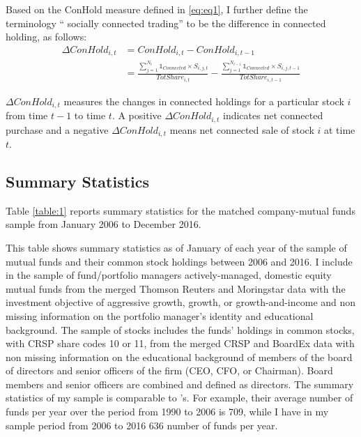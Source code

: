 \documentclass[11pt]{article}
\begin{document}
\begin{doublespace}
Based on the ConHold measure defined in \ref{eq:eq1}, I further define the terminology `` socially connected trading'' to be the difference in connected holding, as follows:
\begin{equation} \label{eq:eq2}
\begin{split}
 \Delta ConHold_{i,t} & = ConHold_{i,t} - ConHold_{i,t-1} \\
 & = \frac{\sum_{j=1}^{N_t}\mathbb{1}_{Connected} \times S_{i,j,t}} {TotShare_{i,t}}
 - \frac{\sum_{j=1}^{N_{t-1}}\mathbb{1}_{Connected} \times S_{i,j,t-1}} {TotShare_{i,t-1}}
\end{split}
\end{equation}

$\Delta ConHold_{i,t}$ measures the changes in connected holdings for a particular stock $i$ from time $t-1$ to time $t$. A positive $\Delta ConHold_{i,t}$ indicates net connected purchase and a negative $\Delta ConHold_{i,t}$ means net connected sale of stock $i$ at time $t$. 


\subsection{Summary Statistics}
Table \ref{table:1} reports summary statistics for the matched company-mutual funds sample from January 2006 to December 2016.  

  This table shows summary statistics as of January of each year of the sample of mutual funds and their common stock holdings between 2006 and 2016. I include in the sample of fund/portfolio managers actively-managed, domestic equity mutual funds from the merged Thomson Reuters and Moringstar data with the investment objective of aggressive growth, growth, or growth-and-income and non missing information on the portfolio manager's identity and educational background. The sample of stocks includes the funds' holdings in common stocks, with CRSP share codes 10 or 11, from the merged CRSP and BoardEx data with non missing information on the educational background of members of the board of directors and senior officers of the firm (CEO, CFO, or Chairman). Board members and senior officers are combined and defined as directors. The summary statistics of my sample is comparable to \cite{cohen2008small} 's. For example, their average number of funds per year over the period from 1990 to 2006 is 709, while I have in my sample period from 2006 to 2016 636 number of funds per year. 



\end{doublespace}
\end{document}
